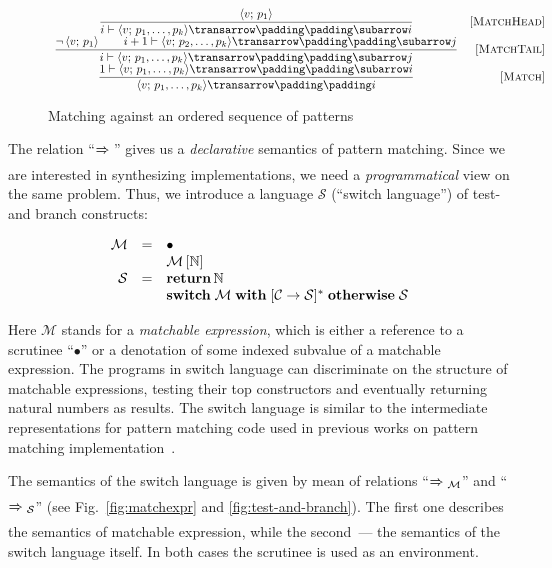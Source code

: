 \begin{figure}
   \renewcommand*{\arraystretch}{3}
   \setarrow{\xRightarrow}
   \setsubarrow{_*}
   \[
   \begin{array}{cr}
     \trule{\inbr{v;\,p_1}}
           {\withenv{i}{\trans{\inbr{v;\,p_1,\dots,p_k}}{}{i}}} & \ruleno{MatchHead}\\
     \trule{\neg\inbr{v;\,p_1}\qquad\withenv{i+1}{\trans{\inbr{v;\,p_2,\dots,p_k}}{}{j}}}
           {\withenv{i}{\trans{\inbr{v;\,p_1,\dots,p_k}}{}{j}}} & \ruleno{MatchTail}\\
     \trule{\withenv{1}{\trans{\inbr{v;\,p_1,\dots,p_k}}{}{i}}}
           {\setsubarrow{}\trans{\inbr{v;\,p_1,\dots,p_k}}{}{i}} & \ruleno{Match}
   \end{array}
   \]
   \caption{Matching against an ordered sequence of patterns}
   \label{fig:matchpatts}
\end{figure}

The relation ``$\xRightarrow{}{}$'' gives us a \emph{declarative} semantics of pattern matching. Since we are interested in
synthesizing implementations, we need a \emph{programmatical} view on the same problem. Thus, we introduce a language $\mathcal S$
(``switch language'') of test-and branch constructs:


\[
\begin{array}{rcl}
  \mathcal M & = & \bullet \\
  &   & \mathcal M\,[\mathbb{N}] \\
  \mathcal{S} & = & \mathbf{return}\,\mathbb{N} \\
  &   & \mathbf{switch}\;\mathcal{M}\;\mathbf{with}\; [\mathcal{C}\; \mathbf{\rightarrow}\; \mathcal{S}]^*\;\mathbf{otherwise}\;\mathcal{S}
\end{array}
\]
 
Here $\mathcal{M}$ stands for a \emph{matchable expression}, which is either a reference to a scrutinee ``$\bullet$'' or
a denotation of some indexed subvalue of a matchable expression. The programs in switch language can discriminate on the
structure of matchable expressions, testing their top constructors and eventually returning natural numbers as results.
The switch language is similar to the intermediate representations for pattern matching code used in 
previous works on pattern matching implementation~\cite{maranget2001,maranget2008}.

The semantics of the switch language is given by mean of relations ``$\xRightarrow{}{}_{\mathcal M}$'' and ``$\xRightarrow{}{}_{\mathcal S}$''
(see Fig.~\ref{fig:matchexpr} and \ref{fig:test-and-branch}). The first one describes the semantics of matchable expression, while
the second~--- the semantics of the switch language itself. In both cases the scrutinee is used as an environment.


